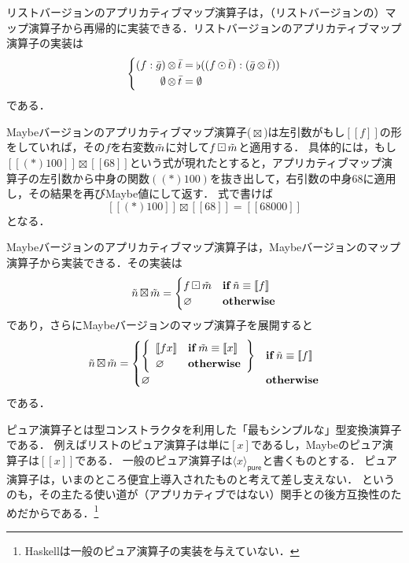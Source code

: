 \documentclass[twocolumn]{jsbook}
\def\[{[\![}
\def\]{]\!]}
\DeclareMathOperator{\hsklApplicativeListMap}{\otimes}
\DeclareMathOperator{\hsklApplicativeMaybeMap}{\boxtimes}
\DeclareMathOperator{\hsklConcat}{\flat}
\DeclareMathOperator{\hsklMap}{\odot}
\DeclareMathOperator{\hsklMaybeMap}{\boxdot}
\newcommand{\hsklEmptyList}{\emptyset}
\newcommand{\hsklNothing}{\varnothing}
\newcommand{\hsklJust}[1]{\[#1\]}
\newcommand{\hsklList}[1]{\Bar{#1}}
\newcommand{\hsklMaybe}[1]{\Tilde{#1}}
\newcommand{\hsklPure}[1]{\langle#1\rangle_\textsf{pure}}
\newcommand{\mathKeyword}[1]{\mathbf{#1}}
\DeclareMathOperator{\mathIf}{\mathKeyword{if}}
\newcommand{\mathOtherwise}{\mathKeyword{otherwise}}
\begin{document}
リストバージョンのアプリカティブマップ演算子は，（リストバージョンの）マップ演算子から再帰的に実装できる．リストバージョンのアプリカティブマップ演算子の実装は
\begin{equation*}
\left\{
\begin{split}
(f:\hsklList{g})\hsklApplicativeListMap\hsklList{t}&=\hsklConcat((f\hsklMap\hsklList{t}):(\hsklList{g}\hsklApplicativeListMap\hsklList{t}))\\
\hsklEmptyList\hsklApplicativeListMap\hsklList{t}&=\hsklEmptyList
\end{split}
\right.
\end{equation*}
である．

Maybeバージョンのアプリカティブマップ演算子($\hsklApplicativeMaybeMap$)は左引数がもし$\hsklJust{f}$の形をしていれば，その$f$を右変数$\hsklMaybe{m}$に対して$f\hsklMaybeMap\hsklMaybe{m}$と適用する．
具体的には，もし$\hsklJust{(*)100}\hsklApplicativeMaybeMap{}\hsklJust{68}$という式が現れたとすると，アプリカティブマップ演算子の左引数から中身の関数$((*)100)$を抜き出して，右引数の中身$68$に適用し，その結果を再びMaybe値にして返す．
式で書けば
$$\hsklJust{(*)100}\hsklApplicativeMaybeMap{}\hsklJust{68}=\hsklJust{68000}$$
となる．

Maybeバージョンのアプリカティブマップ演算子は，Maybeバージョンのマップ演算子から実装できる．その実装は
\begin{equation*}
\hsklMaybe{n}\hsklApplicativeMaybeMap\hsklMaybe{m}=\begin{cases}
f\hsklMaybeMap\hsklMaybe{m}&\mathIf\hsklMaybe{n}\equiv\hsklJust{f}\\
\hsklNothing&\mathOtherwise
\end{cases}
\end{equation*}
であり，さらにMaybeバージョンのマップ演算子を展開すると
\begin{equation*}
\hsklMaybe{n}\hsklApplicativeMaybeMap\hsklMaybe{m}=\begin{cases}
\left\{
\begin{array}{ll}
\hsklJust{fx}&\mathIf\hsklMaybe{m}\equiv\hsklJust{x}\\
\hsklNothing&\mathOtherwise
\end{array}\right\}&\mathIf\hsklMaybe{n}\equiv\hsklJust{f}\\
\hsklNothing&\mathOtherwise
\end{cases}
\end{equation*}
である．

ピュア演算子とは型コンストラクタを利用した「最もシンプルな」型変換演算子である．
例えばリストのピュア演算子は単に$[x]$であるし，Maybeのピュア演算子は$\hsklJust{x}$である．
一般のピュア演算子は$\hsklPure{x}$と書くものとする．
ピュア演算子は，いまのところ便宜上導入されたものと考えて差し支えない．
というのも，その主たる使い道が（アプリカティブではない）関手との後方互換性のためだからである．\footnote{Haskellは一般のピュア演算子の実装を与えていない．}
\end{document}
